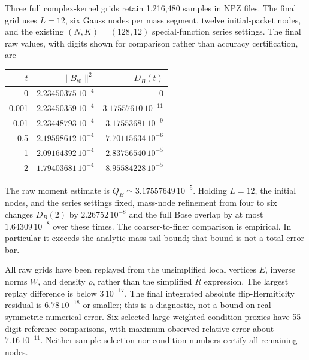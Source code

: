 Three full complex-kernel grids retain 1,216,480 samples in NPZ files.
The final grid uses $L=12$, six Gauss nodes per mass segment, twelve
initial-packet nodes, and the existing $(N,K)=(128,12)$ special-function
series settings. The final raw values, with digits shown for comparison
rather than accuracy certification, are
\begin{center}
\begin{tabular}{rrr}
\toprule
$t$ & $\|B_{t0}\|^2$ & $D_B(t)$\\
\midrule
0 & $2.23450375\,10^{-4}$ & $0$\\
0.001 & $2.23450359\,10^{-4}$ & $3.17557610\,10^{-11}$\\
0.01 & $2.23448793\,10^{-4}$ & $3.17553681\,10^{-9}$\\
0.5 & $2.19598612\,10^{-4}$ & $7.70115634\,10^{-6}$\\
1 & $2.09164392\,10^{-4}$ & $2.83756540\,10^{-5}$\\
2 & $1.79403681\,10^{-4}$ & $8.95584228\,10^{-5}$\\
\bottomrule
\end{tabular}
\end{center}
The raw moment estimate is $Q_B\simeq3.17557649\,10^{-5}$.
Holding $L=12$, the initial nodes, and the series settings fixed,
mass-node refinement from four to six changes $D_B(2)$ by
$2.26752\,10^{-8}$ and the full Bose overlap by at most
$1.64309\,10^{-8}$ over these times. The coarser-to-finer comparison
is empirical. In particular it exceeds the analytic mass-tail bound;
that bound is not a total error bar.

All raw grids have been replayed from the unsimplified local vertices
$E$, inverse norms $W$, and density $\rho$, rather than the simplified
$\widehat R$ expression. The largest replay difference is below
$3\,10^{-17}$. The final integrated absolute flip-Hermiticity residual
is $6.78\,10^{-18}$ or smaller; this is a diagnostic, not a bound on
real symmetric numerical error. Six selected large weighted-condition
proxies have 55-digit reference comparisons, with maximum observed
relative error about $7.16\,10^{-11}$. Neither sample selection nor
condition numbers certify all remaining nodes.

